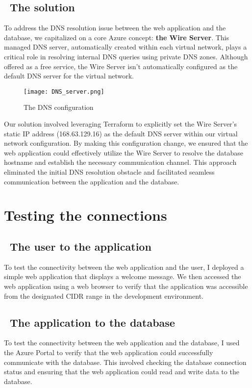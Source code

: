 \subsection*{ \textbullet\ The solution}
To address the DNS resolution issue between the web application and the database, we capitalized on a core Azure concept: \textbf{the Wire Server}. This managed DNS server, automatically created within each virtual network, plays a critical role in resolving internal DNS queries using private DNS zones. Although offered as a free service, the Wire Server isn't automatically configured as the default DNS server for the virtual network.

\begin{figure}[H]
    \centering
    \texttt{[image: DNS\_server.png]}
    \caption{The DNS configuration}
    \label{fig:dns_configuration}
\end{figure}

Our solution involved leveraging Terraform to explicitly set the Wire Server's static IP address (168.63.129.16) as the default DNS server within our virtual network configuration. By making this configuration change, we ensured that the web application could effectively utilize the Wire Server to resolve the database hostname and establish the necessary communication channel. This approach eliminated the initial DNS resolution obstacle and facilitated seamless communication between the application and the database.

\section{Testing the connections}
\subsection*{ \textbullet\ The user to the application}
To test the connectivity between the web application and the user, I deployed a simple web application that displays a welcome message. We then accessed the web application using a web browser to verify that the application was accessible from the designated CIDR range in the development environment.
\subsection*{ \textbullet\ The application to the database}
To test the connectivity between the web application and the database, I used the Azure Portal to verify that the web application could successfully communicate with the database. This involved checking the database connection status and ensuring that the web application could read and write data to the database.
